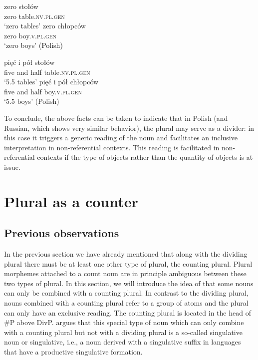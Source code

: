 \documentclass[output=paper,colorlinks,citecolor=brown]{langscibook}
\begin{document}
\ea\label{ex:geist:19}
\ea\gll zero stołów \\
zero table.\textsc{nv.pl.gen} \\
\glt `zero tables' \label{ex:geist:19a}
\ex\gll zero chłopców \\
zero boy.\textsc{v.pl.gen} \\
\glt `zero boys' \label{ex:geist:19b}
\hfill (Polish)\z\z

\ea\label{ex:geist:20}
\ea\gll pięć i pół stołów \\
five and half table.\textsc{nv.pl.gen} \\
\glt `5.5 tables' \label{ex:geist:20a}
\ex\gll pięć i pół chłopców \\
five and half boy.\textsc{v.pl.gen} \\
\glt `5.5 boys' \label{ex:geist:20b}
\hfill (Polish)\z\z

\noindent To conclude, the above facts can be taken to indicate that in Polish (and Russian, which shows very similar behavior), the plural may serve as a divider: in this case it triggers a generic reading of the noun and facilitates an inclusive interpretation in non-referential contexts. This reading is facilitated in non-referential contexts if the type of objects rather than the quantity of objects is at issue.


\section{Plural as a counter}\label{sec:geist:3}

\subsection{Previous observations}\label{sec:geist:3.1}

In the previous section we have already mentioned that along with the dividing plural there must be at least one other type of plural, the counting plural. Plural morphemes attached to a count noun are in principle ambiguous between these two types of plural. In this section, we will introduce the idea of \citet{Mathieu2012,Mathieu2014} that some nouns can only be combined with a counting plural. In contrast to the dividing plural, nouns combined with a counting plural refer to a group of atoms and the plural can only have an exclusive reading. The counting plural is located in the head of \#P above DivP. \citet{Mathieu2012,Mathieu2014} argues that this special type of noun which can only combine with a counting plural but not with a dividing plural is a so-called singulative noun or singulative, i.e., a noun derived with a singulative suffix in languages that have a productive singulative formation.   
\end{document}
